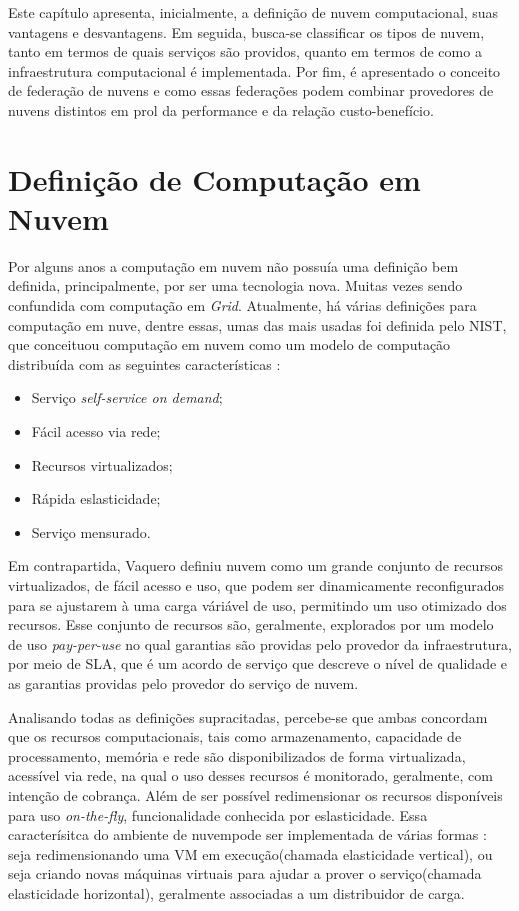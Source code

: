 Este capítulo apresenta, inicialmente, a definição de nuvem computacional, suas vantagens e desvantagens. Em seguida, busca-se classificar os tipos de nuvem, tanto em termos de quais serviços são providos, quanto em termos de como a infraestrutura computacional é implementada. Por fim, é apresentado o conceito de federação de nuvens e como essas federações podem combinar provedores de nuvens distintos em prol da performance e da relação custo-benefício.

\section{Definição de Computação em Nuvem}

Por alguns anos a computação em nuvem não possuía uma definição bem definida, principalmente, por ser uma tecnologia nova. Muitas vezes sendo confundida com computação em \textit{Grid}\cite{Vaquero:2008:BCT:1496091.1496100_Cloud_definition}. Atualmente, há várias definições para computação em nuve, dentre essas, umas das mais usadas foi definida pelo \acrfull{NIST}, que conceituou computação em nuvem como um modelo de computação distribuída com as seguintes características \cite{NIST_CLOUD_DEFINITION}: 
\begin{itemize}
	\item Serviço \textit{self-service on demand};
	\item Fácil acesso via rede;
	\item Recursos virtualizados;
	\item Rápida eslasticidade; 
	\item Serviço mensurado.
\end{itemize}

Em contrapartida, Vaquero\cite{Vaquero:2008:BCT:1496091.1496100_Cloud_definition} definiu nuvem como um grande conjunto de recursos virtualizados, de fácil acesso e uso, que podem ser dinamicamente reconfigurados para se ajustarem à uma carga váriável de uso, permitindo um uso otimizado dos recursos. Esse conjunto de recursos são, geralmente, explorados por um modelo de uso \textit{pay-per-use} no qual garantias são providas pelo provedor da infraestrutura, por meio de \acrfull{SLA}, que é um acordo de serviço que descreve o nível de qualidade e as garantias providas pelo provedor do serviço de nuvem.

Analisando todas as definições supracitadas, percebe-se que ambas concordam que os recursos computacionais, tais como armazenamento, capacidade de processamento, memória e rede são disponibilizados de forma virtualizada, acessível via rede, na qual o uso desses recursos é monitorado, geralmente, com intenção de cobrança. Além de ser possível redimensionar os recursos disponíveis para uso \textit{on-the-fly}, funcionalidade conhecida por eslasticidade. Essa caracterísitca do ambiente de nuvempode ser implementada de várias formas \cite{Coutinho2015}: seja redimensionando uma \acrshort{VM} em execução(chamada elasticidade vertical), ou seja criando novas máquinas virtuais para ajudar a prover o serviço(chamada elasticidade horizontal), geralmente associadas a um distribuidor de carga.

